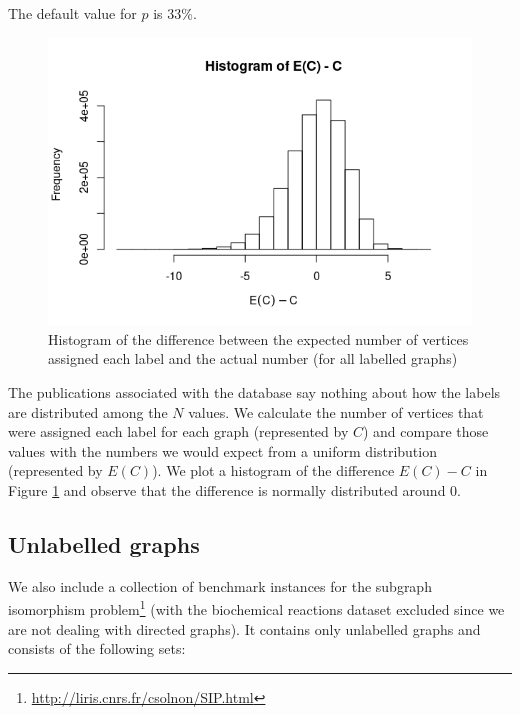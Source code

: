 \documentclass{article}
\theoremstyle{definition}
\begin{document}
The default value for $p$ is 33\%.

\begin{figure}
  \includegraphics[scale=0.5]{labelling_histogram.png}
  \caption{Histogram of the difference between the expected number of vertices
    assigned each label and the actual number (for all labelled graphs)}
  \label{figure:labelling_histogram}
\end{figure}

The publications associated with the database \cite{DeSanto2003, foggia2001-2}
say nothing about how the labels are distributed among the $N$ values. We
calculate the number of vertices that were assigned each label for each graph
(represented by $C$) and compare those values with the numbers we would expect
from a uniform distribution (represented by $E(C)$). We plot a histogram of the
difference $E(C) - C$ in Figure \ref{figure:labelling_histogram} and observe
that the difference is normally distributed around 0.

\subsection{Unlabelled graphs}
We also include a collection of benchmark instances for the subgraph isomorphism
problem\footnote{\url{http://liris.cnrs.fr/csolnon/SIP.html}} (with the
biochemical reactions dataset excluded since we are not dealing with directed
graphs). It contains only unlabelled graphs and consists of the following sets:
\end{document}
